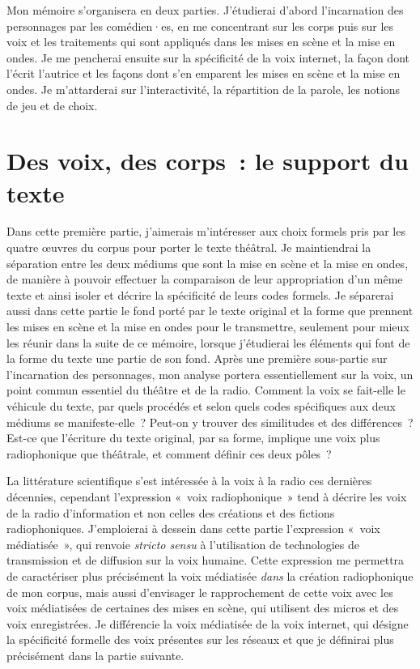 \documentclass[
]{article}
\begin{document}
Mon mémoire s'organisera en deux parties. J'étudierai d'abord l'incarnation des personnages par les comédien·es, en me concentrant sur les corps puis sur les voix et les traitements qui sont appliqués dans les mises en scène et la mise en ondes. Je me pencherai ensuite sur la spécificité de la voix internet, la façon dont l'écrit l'autrice et les façons dont s'en emparent les mises en scène et la mise en ondes. Je m'attarderai sur l'interactivité, la répartition de la parole, les notions de jeu et de choix.

\section{Des voix, des corps~: le support du texte}\label{des-voix-des-corps-le-support-du-texte}

Dans cette première partie, j'aimerais m'intéresser aux choix formels pris par les quatre œuvres du corpus pour porter le texte théâtral. Je maintiendrai la séparation entre les deux médiums que sont la mise en scène et la mise en ondes, de manière à pouvoir effectuer la comparaison de leur appropriation d'un même texte et ainsi isoler et décrire la spécificité de leurs codes formels. Je séparerai aussi dans cette partie le fond porté par le texte original et la forme que prennent les mises en scène et la mise en ondes pour le transmettre, seulement pour mieux les réunir dans la suite de ce mémoire, lorsque j'étudierai les éléments qui font de la forme du texte une partie de son fond. Après une première sous-partie sur l'incarnation des personnages, mon analyse portera essentiellement sur la voix, un point commun essentiel du théâtre et de la radio. Comment la voix se fait-elle le véhicule du texte, par quels procédés et selon quels codes spécifiques aux deux médiums se manifeste-elle~? Peut-on y trouver des similitudes et des différences~? Est-ce que l'écriture du texte original, par sa forme, implique une voix plus radiophonique que théâtrale, et comment définir ces deux pôles~?

La littérature scientifique s'est intéressée à la voix à la radio ces dernières décennies, cependant l'expression «~voix radiophonique~» tend à décrire les voix de la radio d'information et non celles des créations et des fictions radiophoniques. J'emploierai à dessein dans cette partie l'expression «~voix médiatisée~», qui renvoie \emph{stricto sensu} à l'utilisation de technologies de transmission et de diffusion sur la voix humaine. Cette expression me permettra de caractériser plus précisément la voix médiatisée \emph{dans }la création radiophonique de mon corpus, mais aussi d'envisager le rapprochement de cette voix avec les voix médiatisées de certaines des mises en scène, qui utilisent des micros et des voix enregistrées. Je différencie la voix médiatisée de la voix internet, qui désigne la spécificité formelle des voix présentes sur les réseaux et que je définirai plus précisément dans la partie suivante.
\end{document}
